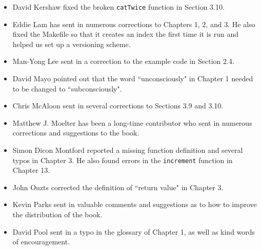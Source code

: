 \documentclass[10pt]{book}
\begin{document}
\begin{itemize}
\item David Kershaw fixed the broken {\tt catTwice} function in Section
3.10.


\item Eddie Lam has sent in numerous corrections to Chapters 
1, 2, and 3.
He also fixed the Makefile so that it creates an index the first time it is
run and helped us set up a versioning scheme.  


\item Man-Yong Lee sent in a correction to the example code in
Section 2.4.  


\item David Mayo pointed out that the word ``unconsciously"
in Chapter 1 needed
to be changed to ``subconsciously".


\item Chris McAloon sent in several corrections to Sections 3.9 and
3.10.


\item Matthew J. Moelter has been a long-time contributor who sent
in numerous corrections and suggestions to the book.  


\item Simon Dicon Montford reported a missing function definition and
several typos in Chapter 3.  He also found errors in the {\tt increment}
function in Chapter 13.


\item John Ouzts corrected the definition of ``return value"
in Chapter 3.


\item Kevin Parks sent in valuable comments and suggestions as to how
to improve the distribution of the book.


\item David Pool sent in a typo in the glossary of Chapter 1, as well
as kind words of encouragement.


\end{itemize}
\end{document}
